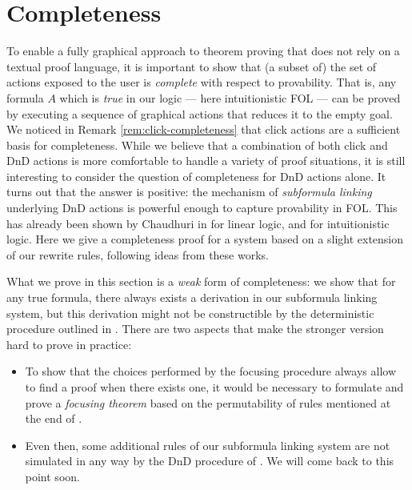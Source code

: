 \section{Completeness}

To enable a fully graphical approach to theorem proving that does not rely on a
textual proof language, it is important to show that (a subset of) the set of
actions exposed to the user is \emph{complete} with respect to provability. That
is, any formula $A$ which is \emph{true} in our logic --- here intuitionistic
FOL --- can be proved by executing a sequence of graphical actions that reduces
it to the empty goal. We noticed in Remark \ref{rem:click-completeness} that
click actions are a sufficient basis for completeness. While we believe that a
combination of both click and DnD actions is more comfortable to handle a
variety of proof situations, it is still interesting to consider the question of
completeness for DnD actions alone. It turns out that the answer is positive:
the mechanism of \emph{subformula linking} underlying DnD actions is powerful
enough to capture provability in FOL. This has already been shown by Chaudhuri
in \cite{Chaudhuri2013} for linear logic, and \cite{DBLP:conf/cade/Chaudhuri21}
for intuitionistic logic. Here we give a completeness proof for a system based
on a slight extension of our rewrite rules, following ideas from these works.

\begin{remark}
  What we prove in this section is a \emph{weak} form of completeness: we show
  that for any true formula, there always exists a derivation in our subformula
  linking system, but this derivation might not be constructible by the
  deterministic procedure outlined in . There are two aspects
  that make the stronger version hard to prove in practice:
  \begin{itemize}
    \item To show that the choices performed by the focusing procedure always
    allow to find a proof when there exists one, it would be necessary to
    formulate and prove a \emph{focusing theorem} based on the permutability of
    rules mentioned at the end of .
    \item Even then, some additional rules of our subformula linking system are
    not simulated in any way by the DnD procedure of . We will come
    back to this point soon.
  \end{itemize}  
\end{remark}

